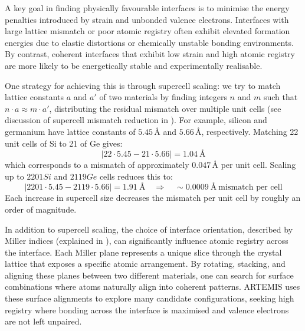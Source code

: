A key goal in finding physically favourable interfaces is to minimise the energy penalties introduced by strain and unbonded valence electrons\cite{Gerber2023-yd, Butler2019-ws}.
Interfaces with large lattice mismatch or poor atomic registry often exhibit elevated formation energies due to elastic distortions or chemically unstable bonding environments\cite{Hepplestone2010-vw, Chagarov2015-ol, Zhang2016-lt}.
By contrast, coherent interfaces that exhibit low strain and high atomic registry are more likely to be energetically stable and experimentally realisable\cite{Gerber2023-yd, Davies2024-ju, Chagarov2015-ol}.

One strategy for achieving this is through supercell scaling\cite{artemis_paper}: we try to match lattice constants $a$ and $a'$ of two materials by finding integers $n$ and $m$ such that $n \cdot a \approx m \cdot a'$, distributing the residual mismatch over multiple unit cells (see discussion of supercell mismatch reduction in ).
For example, silicon and germanium have lattice constants of $5.45\,\text{\AA{}}$ and $5.66\,\text{\AA{}}$, respectively.
\newpage Matching 22 unit cells of Si to 21 of Ge gives:
\begin{equation}
    |22 \cdot 5.45 - 21 \cdot 5.66| = 1.04~\text{\AA}
\end{equation}
which corresponds to a mismatch of approximately $0.047\,\text{\AA{}}$ per unit cell.
Scaling up to $2201 Si$ and $2119 Ge$ cells reduces this to:
\begin{equation}
    |2201 \cdot 5.45 - 2119 \cdot 5.66| = 1.91~\text{\AA} \quad \Rightarrow \quad \sim 0.0009~\text{\AA}~\text{mismatch per cell}
\end{equation}
Each increase in supercell size decreases the mismatch per unit cell by roughly an order of magnitude.

In addition to supercell scaling, the choice of interface orientation, described by Miller indices (explained in ), can significantly influence atomic registry across the interface.
Each Miller plane represents a unique slice through the crystal lattice that exposes a specific atomic arrangement\cite{artemis_paper}.
By rotating, stacking, and aligning these planes between two different materials, one can search for surface combinations where atoms naturally align into coherent patterns.
ARTEMIS uses these surface alignments to explore many candidate configurations, seeking high registry where bonding across the interface is maximised and valence electrons are not left unpaired\cite{artemis_paper}.


